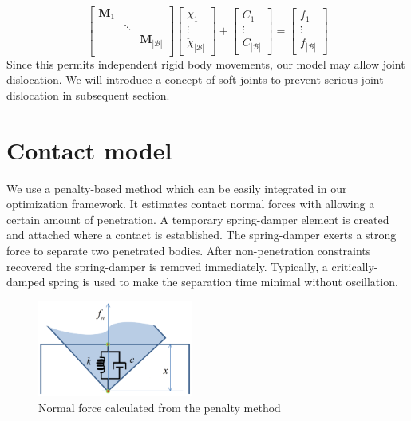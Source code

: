 \documentclass[master,english,final]{kaist-ucs}
\begin{document}
\begin{equation}
\left [
\begin{array}{ccc}
\mathbf{M}_1                      &            &                               \\
                                  &  \ddots    &                               \\
                                  &            & \mathbf{M}_{|\mathcal{B}|}    \\
\end{array}
\right ]
\left [
\begin{array}{c}
\ddot{\chi}_1 \\
\vdots \\
\ddot{\chi}_{|\mathcal{B}|}
\end{array}
\right ]
+
\left [
\begin{array}{c}
C_1 \\
\vdots \\
C_{|\mathcal{B}|}
\end{array}
\right ]
=
\left [
\begin{array}{c}
f_1 \\
\vdots \\
f_{|\mathcal{B}|}
\end{array}
\right ]
\end{equation}
Since this permits independent rigid body movements,
our model may allow joint dislocation.
We will introduce a concept of soft joints to prevent serious
joint dislocation in subsequent section.



\section{Contact model}

We use a penalty-based method which can be easily integrated in our optimization framework.
It estimates contact normal forces with allowing a certain amount of penetration.
A temporary spring-damper element is created and attached where a contact is established.
The spring-damper exerts a strong force to separate two penetrated bodies.
After non-penetration constraints recovered the spring-damper is removed immediately.
Typically, a critically-damped spring is used to make the separation time minimal without oscillation.

\begin{figure}[h!]
  \centering
  \includegraphics[width=2.0in]{penalty}
  \caption{Normal force calculated from the penalty method}
\end{figure}
\end{document}
